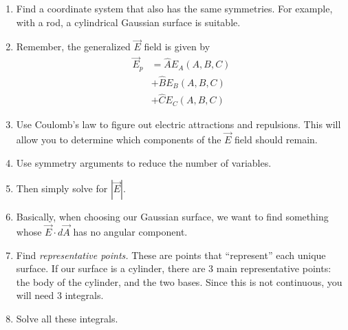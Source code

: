 \documentclass[12pt]{extreport}
\begin{document}
\begin{itemize}
\begin{enumerate}
				\item Find a coordinate system that also has the same symmetries. For example, with a rod, a cylindrical Gaussian surface is suitable.

				\item Remember, the generalized $\vec E$ field is given by 
				\begin{align*}
					\vec E_p &= \hat A E_A(A, B, C) \\
							 &+ \hat B E_B(A, B, C) \\
							 &+ \hat C E_C(A, B, C)
				\end{align*}

				\item Use Coulomb's law to figure out electric attractions and repulsions. This will allow you to determine which components of the $\vec E$ field should remain.

				\item Use symmetry arguments to reduce the number of variables.

				\item Then simply solve for $|\vec E|.$

				\item Basically, when choosing our Gaussian surface, we want to find something whose $\vec E \cdot d \vec A$ has no angular component.

				\item Find \textit{representative points.} These are points that ``represent'' each unique surface. If our surface is a cylinder, there are 3 main representative points: the body of the cylinder, and the two bases. Since this is not continuous, you will need 3 integrals.

				\item Solve all these integrals.
			\end{enumerate} 
	\end{itemize}
\end{document}
